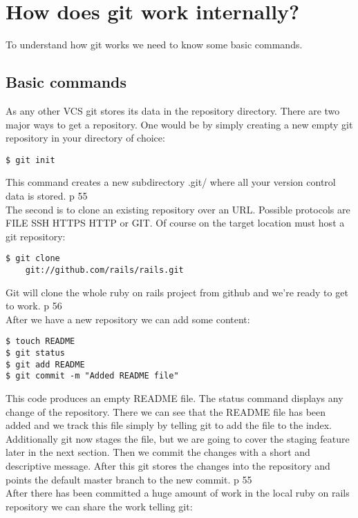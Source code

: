 \section{How does git work internally?}

To understand how git works we need to know some basic commands.

\subsection {Basic commands}

As any other VCS git stores its data in the repository directory.
There are two major ways to get a repository.
One would be by simply creating a new empty git repository in your directory of choice:
\begin{lstlisting}
$ git init
\end{lstlisting}
This command creates a new subdirectory .git/ where all your version control
data is stored. \cite{gitinternals2008} p 55 \\
The second is to clone an existing repository over an URL. Possible protocols
are FILE SSH HTTPS HTTP or GIT. Of course on the target location must host a
git repository:
\begin{lstlisting}
$ git clone 
    git://github.com/rails/rails.git
\end{lstlisting}
Git will clone the whole ruby on rails project from github and we're
ready to get to work. \cite{gitinternals2008} p 56 \\

After we have a new repository we can add some content:
\begin{lstlisting}
$ touch README
$ git status
$ git add README
$ git commit -m "Added README file"
\end{lstlisting}

This code produces an empty README file. The status command displays any change
of the repository. There we can see that the README file has been added and we
track this file simply by telling git to add the file to the index. Additionally
git now stages the file, but we are going to cover the staging feature later in the next
section. Then we commit the changes with a short and descriptive message. After
this git stores the changes into the repository and points the default master
branch to the new commit. \cite{gitinternals2008} p 55 \\

After there has been committed a huge amount of work in the local ruby on rails
repository we can share the work telling git:

